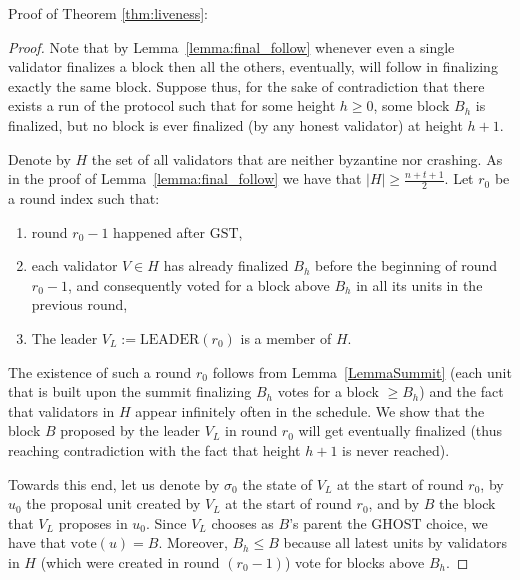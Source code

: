\documentclass[12pt, fleqn]{article}
\newtheorem{lemma}{Lemma}
\newcommand{\vote}{\mathrm{vote}}
\newcommand{\leader}{\mathrm{LEADER}}
\newcommand{\gst}{\mathrm{GST}}
\begin{document}
Proof of Theorem \ref{thm:liveness}:


\begin{proof}
Note that by Lemma~\ref{lemma:final_follow} whenever even a single validator finalizes a block then all the others, eventually, will follow in finalizing exactly the same block.
%
Suppose thus, for the sake of contradiction that there exists a run of the protocol such that for some height $h\geq 0$, some block $B_h$ is finalized, but no block is ever finalized (by any honest validator) at height $h+1$.
%

Denote by $H$ the set of all validators that are neither byzantine nor crashing. As in the proof of Lemma~\ref{lemma:final_follow} we have that $|H|\geq  \frac{n+t+1}{2}.$
%
Let $r_0$ be a round index such that:
\begin{enumerate}
    \item round $r_0-1$ happened after $\gst$,
    \item each validator $V\in H$ has already finalized $B_h$ before the beginning of round $r_0-1$, and consequently voted for a block above $B_h$ in all its units in the previous round,
    \item The leader $V_L:=\leader(r_0)$ is a member of $H$.
\end{enumerate}
The existence of such a round $r_0$ follows from Lemma~\ref{LemmaSummit} (each unit that is built upon the summit finalizing $B_h$ votes for a block $\geq B_h$) and the fact that validators in $H$ appear infinitely often in the schedule.
%
We show that the block $B$ proposed by the leader $V_L$ in round $r_0$ will get eventually finalized (thus reaching contradiction with the fact that height $h+1$ is never reached).

Towards this end, let us denote by $\sigma_0$ the state of $V_L$ at the start of round $r_0$, by $u_0$ the proposal unit created by $V_L$ at the start of round $r_0$, and by $B$ the block that $V_L$ proposes in $u_0$.
%
Since $V_L$ chooses as $B$'s parent the GHOST choice, we have that $\vote(u)=B$.
%
Moreover, $B_h \leq B$ because all latest units by validators in $H$ (which were created in round $(r_0-1)$) vote for blocks above $B_h$.


\end{proof}
\end{document}
